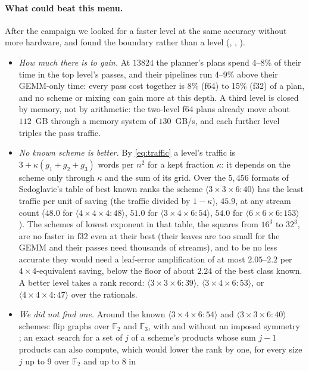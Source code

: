\documentclass[11pt]{article}
\newcommand{\mm}[1]{\langle #1\rangle}
\begin{document}
\paragraph{What could beat this menu.}
After the campaign we looked for a faster level at the same accuracy without
more hardware, and found the boundary rather than a level
(, , ).
\begin{itemize}
\item \emph{How much there is to gain.}  At $13824$ the planner's plans spend
  4--8\% of their time in the top level's passes, and their pipelines run
  4--9\% above their GEMM-only time: every pass cost together is 8\% (f64) to
  15\% (f32) of a plan, and no scheme or mixing can gain more at this depth.
  A third level is closed by memory, not by arithmetic: the two-level f64
  plans already move about $112$~GB through a memory system of $130$~GB/s,
  and each further level triples the pass traffic.
\item \emph{No known scheme is better.}  By \eqref{eq:traffic} a level's
  traffic is $3+\kappa(g_1+g_2+g_3)$ words per $n^2$ for a kept fraction $\kappa$: it depends on the scheme only through $\kappa$ and the sum of its grid.  Over the
  $5{,}456$ formats of Sedoglavic's table of best known ranks
  \cite{Sedoglavic} the scheme $\mm{3\times3\times6:40}$ has the least traffic per unit of saving (the traffic divided by $1-\kappa$), $45.9$, at any stream count ($48.0$ for
  $\mm{4\times4\times4:48}$, $51.0$ for $\mm{3\times4\times6:54}$, $54.0$ for
  $\mm{6\times6\times6:153}$).  The schemes of lowest exponent in that table,
  the squares from $16^3$ to $32^3$, are no faster in f32 even at their
  best (their leaves are too small for the GEMM and their passes need
  thousands of streams), and to be no less accurate they would need a
  leaf-error amplification of at most $2.05$--$2.2$ per $4\times4$-equivalent
  saving, below the floor of about $2.24$ of the best class known.  A better level
  takes a rank record: $\mm{3\times3\times6:39}$, $\mm{3\times4\times6:53}$,
  or $\mm{4\times4\times4:47}$ over the rationals.
\item \emph{We did not find one.}  Around the known $\mm{3\times4\times6:54}$
  and $\mm{3\times3\times6:40}$ schemes: flip graphs \cite{KM22} over
  $\mathbb{F}_2$ and $\mathbb{F}_3$, with and without an imposed symmetry
  \cite{MP25}; an exact search for a set of $j$ of a scheme's products whose
  sum $j-1$ products can also compute, which would lower the rank by one,
  for every size $j$ up to $9$ over $\mathbb{F}_2$ and up to $8$ in

\end{itemize}
\end{document}
